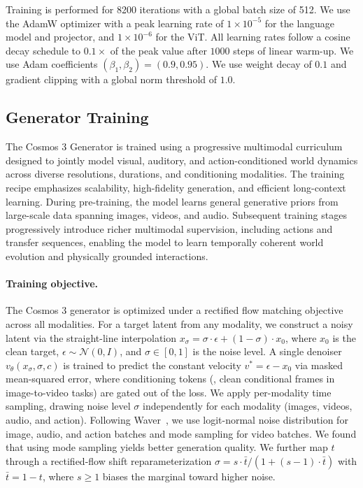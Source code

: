 Training is performed for 8200 iterations with a global batch size of 512. We use the AdamW optimizer with a peak learning rate of $1{\times}10^{-5}$ for the language model and projector, and $1{\times}10^{-6}$ for the ViT. All learning rates follow a cosine decay schedule to $0.1{\times}$ of the peak value after $1000$ steps of linear warm-up. We use Adam coefficients $(\beta_1, \beta_2) = (0.9, 0.95)$. We use weight decay of $0.1$ and gradient clipping with a global norm threshold of $1.0$.
%

\subsection{Generator Training}
\label{sec:generator-training-recipe}

The Cosmos 3 Generator is trained using a progressive multimodal curriculum designed to jointly model visual, auditory, and action-conditioned world dynamics across diverse resolutions, durations, and conditioning modalities. The training recipe emphasizes scalability, high-fidelity generation, and efficient long-context learning. During pre-training, the model learns general generative priors from large-scale data spanning images, videos, and audio. Subsequent training stages progressively introduce richer multimodal supervision, including actions and transfer sequences, enabling the model to learn temporally coherent world evolution and physically grounded interactions.

\paragraph{Training objective.} The Cosmos 3 generator is optimized under a rectified flow matching objective across all modalities. For a target latent from any modality, we construct a noisy latent via the straight-line interpolation $x_\sigma = \sigma \cdot \epsilon + (1 - \sigma) \cdot x_0$, where $x_0$ is the clean target, $\epsilon \sim \mathcal{N}(0, I)$, and $\sigma \in [0, 1]$ is the noise level. A single denoiser $v_\theta(x_\sigma, \sigma, c)$ is trained to predict the constant velocity $v^* = \epsilon - x_0$ via masked mean-squared error, where conditioning tokens (\eg, clean conditional frames in image-to-video tasks) are gated out of the loss.
We apply per-modality time sampling, drawing noise level $\sigma$ independently for each modality (images, videos, audio, and action).
Following Waver~\citep{waver}, we use logit-normal noise distribution for image, audio, and action batches and mode sampling for video batches. We found that using mode sampling yields better generation quality. We further map $t$ through a rectified-flow shift reparameterization $\sigma = s \cdot \bar{t} / (1 + (s-1) \cdot \bar{t})$ with $\bar{t} = 1 - t$, where $s \geq 1$ biases the marginal toward higher noise. 

